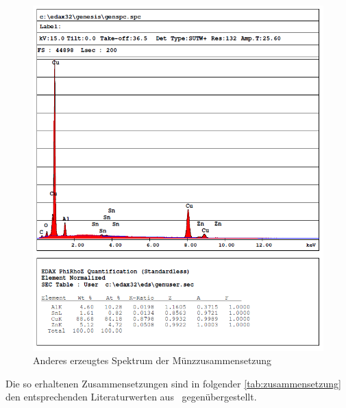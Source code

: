 \documentclass[12pt,english,ngerman]{scrartcl}
\begin{document}
\begin{figure}[H]
	\begin{center}
		\includegraphics[width =\textwidth]{./figures/qualitativ2.png}
	\end{center}
	\caption{Anderes erzeugtes Spektrum der Münzzusammensetzung~\cite{sein_foto}
	}\label{fig:qualitativ2}
\end{figure}

Die so erhaltenen Zusammensetzungen sind in folgender
\autoref{tab:zusammensetzung} den entsprechenden Literaturwerten
aus~\cite{munzen} gegenübergestellt.
\end{document}

